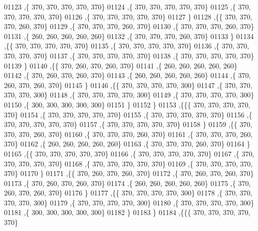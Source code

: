 \begin{DoxyCode}
01123    ,\{   370,   370,   370,   370,   370\}
01124    ,\{   370,   370,   370,   370,   370\}
01125    ,\{   370,   370,   370,   370,   370\}
01126    ,\{   370,   370,   370,   370,   370\}
01127    \}
01128   ,\{\{   370,   370,   370,   260,   370\}
01129    ,\{   370,   370,   370,   260,   370\}
01130    ,\{   370,   370,   370,   260,   370\}
01131    ,\{   260,   260,   260,   260,   260\}
01132    ,\{   370,   370,   370,   260,   370\}
01133    \}
01134   ,\{\{   370,   370,   370,   370,   370\}
01135    ,\{   370,   370,   370,   370,   370\}
01136    ,\{   370,   370,   370,   370,   370\}
01137    ,\{   370,   370,   370,   370,   370\}
01138    ,\{   370,   370,   370,   370,   370\}
01139    \}
01140   ,\{\{   370,   260,   370,   260,   370\}
01141    ,\{   260,   260,   260,   260,   260\}
01142    ,\{   370,   260,   370,   260,   370\}
01143    ,\{   260,   260,   260,   260,   260\}
01144    ,\{   370,   260,   370,   260,   370\}
01145    \}
01146   ,\{\{   370,   370,   370,   370,   300\}
01147    ,\{   370,   370,   370,   370,   300\}
01148    ,\{   370,   370,   370,   370,   300\}
01149    ,\{   370,   370,   370,   370,   300\}
01150    ,\{   300,   300,   300,   300,   300\}
01151    \}
01152   \}
01153  ,\{\{\{   370,   370,   370,   370,   370\}
01154    ,\{   370,   370,   370,   370,   370\}
01155    ,\{   370,   370,   370,   370,   370\}
01156    ,\{   370,   370,   370,   370,   370\}
01157    ,\{   370,   370,   370,   370,   370\}
01158    \}
01159   ,\{\{   370,   370,   370,   260,   370\}
01160    ,\{   370,   370,   370,   260,   370\}
01161    ,\{   370,   370,   370,   260,   370\}
01162    ,\{   260,   260,   260,   260,   260\}
01163    ,\{   370,   370,   370,   260,   370\}
01164    \}
01165   ,\{\{   370,   370,   370,   370,   370\}
01166    ,\{   370,   370,   370,   370,   370\}
01167    ,\{   370,   370,   370,   370,   370\}
01168    ,\{   370,   370,   370,   370,   370\}
01169    ,\{   370,   370,   370,   370,   370\}
01170    \}
01171   ,\{\{   370,   260,   370,   260,   370\}
01172    ,\{   370,   260,   370,   260,   370\}
01173    ,\{   370,   260,   370,   260,   370\}
01174    ,\{   260,   260,   260,   260,   260\}
01175    ,\{   370,   260,   370,   260,   370\}
01176    \}
01177   ,\{\{   370,   370,   370,   370,   300\}
01178    ,\{   370,   370,   370,   370,   300\}
01179    ,\{   370,   370,   370,   370,   300\}
01180    ,\{   370,   370,   370,   370,   300\}
01181    ,\{   300,   300,   300,   300,   300\}
01182    \}
01183   \}
01184  ,\{\{\{   370,   370,   370,   370,   370\}

\end{DoxyCode}

